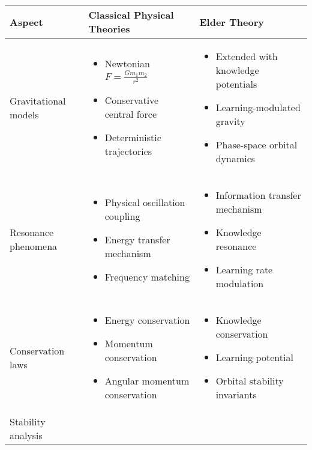 \begin{center}
\begin{tabular}{|p{3cm}|p{5cm}|p{5cm}|}
\hline
\textbf{Aspect} & \textbf{Classical Physical Theories} & \textbf{Elder Theory} \\
\hline
Gravitational models & 
\begin{itemize}
    \item Newtonian $F = \frac{Gm_1m_2}{r^2}$
    \item Conservative central force
    \item Deterministic trajectories
\end{itemize} &
\begin{itemize}
    \item Extended with knowledge potentials
    \item Learning-modulated gravity
    \item Phase-space orbital dynamics
\end{itemize} \\
\hline
Resonance phenomena & 
\begin{itemize}
    \item Physical oscillation coupling
    \item Energy transfer mechanism
    \item Frequency matching
\end{itemize} &
\begin{itemize}
    \item Information transfer mechanism
    \item Knowledge resonance
    \item Learning rate modulation
\end{itemize} \\
\hline
Conservation laws & 
\begin{itemize}
    \item Energy conservation
    \item Momentum conservation
    \item Angular momentum conservation
\end{itemize} &
\begin{itemize}
    \item Knowledge conservation
    \item Learning potential
    \item Orbital stability invariants
\end{itemize} \\
\hline
Stability analysis & 
\begin{itemize}

\end{itemize}
\end{tabular}
\end{center}
